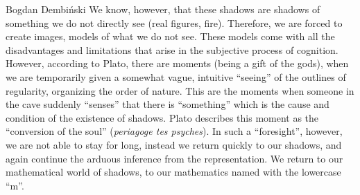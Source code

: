 \begin{artengenv}{Bogdan Dembiński}
We know, however, that these shadows are shadows of
something we do not directly see (real figures, fire). Therefore, we are forced to create images, models of what we do
not see. These models come with all the disadvantages and limitations that arise in the subjective process of
cognition. However, according to Plato, there are moments (being a gift of the gods), when we are temporarily given a
somewhat vague, intuitive ``seeing'' of the outlines of regularity, organizing the order of nature.  This are the moments
when someone in the cave suddenly ``senses'' that there is ``something'' which is the cause and condition of the existence
of shadows. Plato describes this moment as the ``conversion of the soul'' (\textit{periagoge tes psyches}). In
such a ``foresight'', however, we are not able to stay for long, instead we return quickly to our shadows, and again
continue the arduous inference from the representation. We return to our mathematical world of shadows, to our
mathematics named with the lowercase ``m''. 


\end{artengenv}

